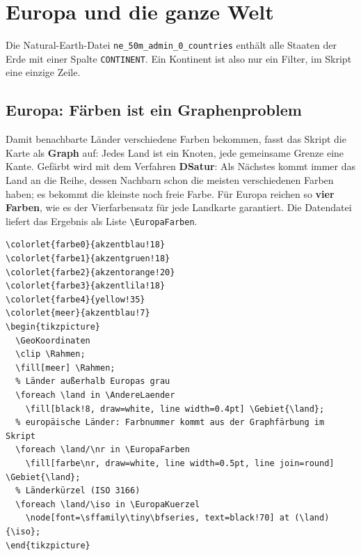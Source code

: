 \section{Europa und die ganze Welt}\label{sec:welt}

Die Natural-Earth-Datei \texttt{ne\_50m\_admin\_0\_countries} enthält alle Staaten der Erde mit einer Spalte \texttt{CONTINENT}. Ein Kontinent ist also nur ein Filter, im Skript eine einzige Zeile.


\subsection{Europa: Färben ist ein Graphenproblem}

Damit benachbarte Länder verschiedene Farben bekommen, fasst das Skript die Karte als \textbf{Graph} auf: Jedes Land ist ein Knoten, jede gemeinsame Grenze eine Kante. Gefärbt wird mit dem Verfahren \textbf{DSatur}: Als Nächstes kommt immer das Land an die Reihe, dessen Nachbarn schon die meisten verschiedenen Farben haben; es bekommt die kleinste noch freie Farbe. Für Europa reichen so \textbf{vier Farben}, wie es der Vierfarbensatz für jede Landkarte garantiert. Die Datendatei liefert das Ergebnis als Liste \texttt{\textbackslash EuropaFarben}.

\begin{lstlisting}[style=latex]
% Präambel: 
\colorlet{farbe0}{akzentblau!18}
\colorlet{farbe1}{akzentgruen!18}
\colorlet{farbe2}{akzentorange!20}
\colorlet{farbe3}{akzentlila!18}
\colorlet{farbe4}{yellow!35}
\colorlet{meer}{akzentblau!7}
\begin{tikzpicture}
  \GeoKoordinaten
  \clip \Rahmen;
  \fill[meer] \Rahmen;
  % Länder außerhalb Europas grau
  \foreach \land in \AndereLaender
    \fill[black!8, draw=white, line width=0.4pt] \Gebiet{\land};
  % europäische Länder: Farbnummer kommt aus der Graphfärbung im Skript
  \foreach \land/\nr in \EuropaFarben
    \fill[farbe\nr, draw=white, line width=0.5pt, line join=round] \Gebiet{\land};
  % Länderkürzel (ISO 3166)
  \foreach \land/\iso in \EuropaKuerzel
    \node[font=\sffamily\tiny\bfseries, text=black!70] at (\land) {\iso};
\end{tikzpicture}
\end{lstlisting}

